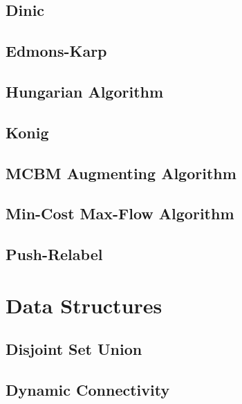 \subsection{Dinic}
\raggedbottom
\hrulefill
\subsection{Edmons-Karp}
\raggedbottom
\hrulefill
\subsection{Hungarian Algorithm}
\raggedbottom
\hrulefill
\subsection{Konig}
\raggedbottom
\hrulefill
\subsection{MCBM Augmenting Algorithm}
\raggedbottom
\hrulefill
\subsection{Min-Cost Max-Flow Algorithm}
\raggedbottom
\hrulefill
\subsection{Push-Relabel}
\raggedbottom
\hrulefill

\section{Data Structures}
\subsection{Disjoint Set Union}
\raggedbottom
\hrulefill
\subsection{Dynamic Connectivity}
\raggedbottom
\hrulefill
